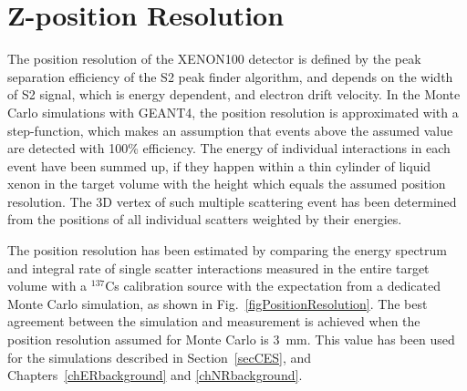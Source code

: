 \section{Z-position Resolution}
\label{secPositionResolution}

The position resolution of the XENON100 detector is defined by the peak separation efficiency of the S2 peak finder algorithm, and depends on the width of S2 signal, which is energy dependent, and electron drift velocity. In the Monte Carlo simulations with GEANT4, the position resolution is approximated with a step-function, which makes an assumption that events above the assumed value are detected with 100\% efficiency. The energy of individual interactions in each event have been summed up, if they happen within a thin cylinder of liquid xenon in the target volume with the height which equals the assumed position resolution. The 3D vertex of such multiple scattering event has been determined from the positions of all individual scatters weighted by their energies.

The position resolution has been estimated by comparing the energy spectrum and integral rate of single scatter interactions measured in the entire target volume with a $^{137}$Cs calibration source with the expectation from a dedicated Monte Carlo simulation, as shown in Fig.~\ref{figPositionResolution}. The best agreement between the simulation and measurement  is achieved when the position resolution assumed for Monte Carlo is 3~mm. This value has been used for the simulations described in Section~\ref{secCES}, and Chapters~\ref{chERbackground} and \ref{chNRbackground}.

